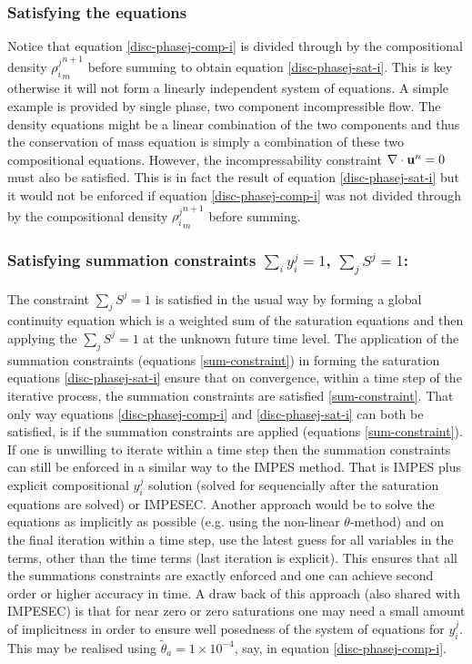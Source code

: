 \subsubsection{Satisfying the equations }
Notice that equation \ref{disc-phasej-comp-i} is divided through by the
compositional density ${\rho_i^j}_m^{n+1}$ before summing to obtain equation
\ref{disc-phasej-sat-i}. This is key otherwise it will not form a
linearly independent system of equations. A simple example is
provided by single phase, two component incompressible flow.
The density equations might be a linear combination of the
two components and thus the conservation of
mass equation is simply a combination of these two compositional
equations. However, the incompressability constraint $\nabla \cdot {\bf u}^n=0$
must also be satisfied. This is in fact the result of
equation \ref{disc-phasej-sat-i} but it would not be enforced
if equation \ref{disc-phasej-comp-i} was not divided through by the
compositional density ${\rho_i^j}_m^{n+1}$ before summing.




\subsubsection{Satisfying summation constraints $\sum_i y_i^j=1$, $\sum_j S^j=1$:}
The constraint $\sum_j S^j=1$ is satisfied in the usual way by
forming a global continuity equation which is a weighted
sum of the saturation equations and then applying the $\sum_j S^j=1$ at
the unknown future time level. The application of
the summation constraints (equations \ref{sum-constraint})
in forming the saturation equations \ref{disc-phasej-sat-i} ensure
that on convergence, within a time step of the iterative process,
the summation constraints are satisfied \ref{sum-constraint}.
That only way equations \ref{disc-phasej-comp-i}
and \ref{disc-phasej-sat-i} can both be satisfied, is if the
summation constraints are applied (equations \ref{sum-constraint}).
If one is unwilling to iterate within a time step then the
summation constraints can still be enforced in a similar
way to the IMPES method.
That is IMPES plus explicit compositional $y_i^j$ solution
(solved for sequencially after the saturation equations are solved) or IMPESEC.
Another approach would be to solve the equations as implicitly
as possible (e.g. using the non-linear $\theta$-method) and on the
final iteration within a time step, use the latest guess for
all variables in the terms, other than the time
terms (last iteration is explicit). This ensures that
all the summations constraints are exactly enforced and
one can achieve second order or higher accuracy in time.
A draw back of this approach (also shared with IMPESEC) is
that for near zero or zero
saturations one may need a small amount of
implicitness in order to ensure well posedness of the
system of equations for $y_i^j$. This may be realised using
$\tilde\theta_a=1\times 10^{-4}$, say,
in equation \ref{disc-phasej-comp-i}.




